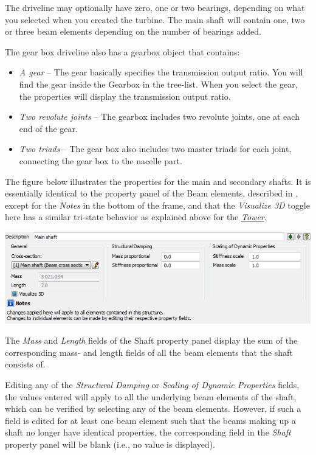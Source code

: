 The driveline may optionally have zero, one or two bearings, depending on what
you selected when you created the turbine. The main shaft will contain one,
two or three beam elements depending on the number of bearings added.

The gear box driveline also has a gearbox object that contains:

\begin{itemize}
\item{\sl A gear} --
  The gear basically specifies the transmission output ratio.
  You will find the gear inside the Gearbox in the tree-list.
  When you select the gear, the properties will display the transmission
  output ratio.
\item{\sl Two revolute joints} --
  The gearbox includes two revolute joints, one at each end of the gear.
\item{\sl Two triads} --
  The gear box also includes two master triads for each joint,
  connecting the gear box to the nacelle part.
\end{itemize}


The figure below illustrates the properties for the main and secondary shafts.
It is essentially identical to the property panel of the Beam elements,
described in ,
except for the {\sl Notes} in the bottom of the frame, and that the
{\sl Visualize 3D} toggle here has a similar tri-state behavior as
explained above for the \protect\hyperlink{tower}{\sl Tower}.

\noindent\includegraphics[width=\textwidth]{Figures/3b-MainShaft-Prop}

The {\sl Mass} and {\sl Length} fields of the Shaft property panel display the
sum of the corresponding mass- and length fields of all the beam elements
that the shaft consists of.

Editing any of the {\sl Structural Damping} or
{\sl Scaling of Dynamic Properties} fields, the values entered will apply to
all the underlying beam elements of the shaft, which can be verified
by selecting any of the beam elements. However,
if such a field is edited for at least one beam element such that the beams
making up a shaft no longer have identical properties,
the corresponding field in the {\sl Shaft} property panel will be blank
(i.e., no value is displayed).

